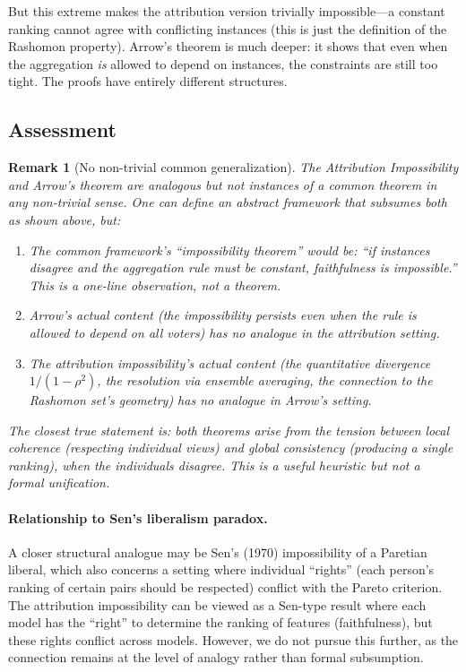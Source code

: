 \documentclass{article}
\newtheorem{remark}[theorem]{Remark}
\begin{document}
But this extreme makes the attribution version trivially
impossible---a constant ranking cannot agree with conflicting
instances (this is just the definition of the Rashomon property).
Arrow's theorem is much deeper: it shows that even when the
aggregation \emph{is} allowed to depend on instances, the constraints
are still too tight. The proofs have entirely different structures.

\subsection{Assessment}

\begin{remark}[No non-trivial common generalization]
\label{rem:no-arrow-unification}
The Attribution Impossibility and Arrow's theorem are \emph{analogous}
but not \emph{instances of a common theorem} in any non-trivial sense.
One can define an abstract framework that subsumes both as shown above,
but:
\begin{enumerate}
    \item The common framework's ``impossibility theorem'' would be:
      ``if instances disagree and the aggregation rule must be constant,
      faithfulness is impossible.'' This is a one-line observation,
      not a theorem.
    \item Arrow's actual content (the impossibility persists even when
      the rule \emph{is} allowed to depend on all voters) has no
      analogue in the attribution setting.
    \item The attribution impossibility's actual content (the
      quantitative divergence $1/(1-\rho^2)$, the resolution via
      ensemble averaging, the connection to the Rashomon set's geometry)
      has no analogue in Arrow's setting.
\end{enumerate}
The closest true statement is: \emph{both theorems arise from the
tension between local coherence (respecting individual views) and
global consistency (producing a single ranking), when the individuals
disagree}. This is a useful heuristic but not a formal unification.
\end{remark}

\paragraph{Relationship to Sen's liberalism paradox.}
A closer structural analogue may be Sen's (1970) impossibility of a
Paretian liberal, which also concerns a setting where individual
``rights'' (each person's ranking of certain pairs should be
respected) conflict with the Pareto criterion. The attribution
impossibility can be viewed as a Sen-type result where each model
has the ``right'' to determine the ranking of features (faithfulness),
but these rights conflict across models.
However, we do not pursue this further, as the connection remains
at the level of analogy rather than formal subsumption.
\end{document}
